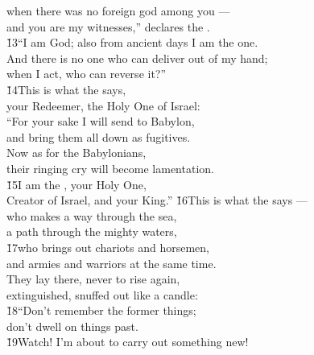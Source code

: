 \begin{poetry}
\poemll    when there was no foreign god among you --- \\
\poemlll       and you are my witnesses,'' declares the . \\
\poeml \v{13}``I am God; also from ancient days I am the one. \\
\poemll    And there is no one who can deliver out of my hand; \\
\poemlll       when I act, who can reverse it?'' \\
\poeml \v{14}This is what the  says, \\
\poemll    your Redeemer, the Holy One of Israel: \\
\poeml ``For your sake I will send to Babylon, \\
\poemll    and bring them all down as fugitives. \\
\poeml Now as for the Babylonians, \\
\poemll    their ringing cry will become lamentation. \\
\poeml \v{15}I am the , your Holy One, \\
\poemll    Creator of Israel, and your King.''
\poeml \v{16}This is what the  says --- \\
\poemll    who makes a way through the sea, \\
\poemlll       a path through the mighty waters, \\
\poeml \v{17}who brings out chariots and horsemen, \\
\poemll    and armies and warriors at the same time. \\
\poeml They lay there, never to rise again, \\
\poemll    extinguished, snuffed out like a candle: \\
\poeml \v{18}``Don't remember the former things; \\
\poemll    don't dwell on things past. \\
\poeml \v{19}Watch! I'm about to carry out something new! \\

\end{poetry}
